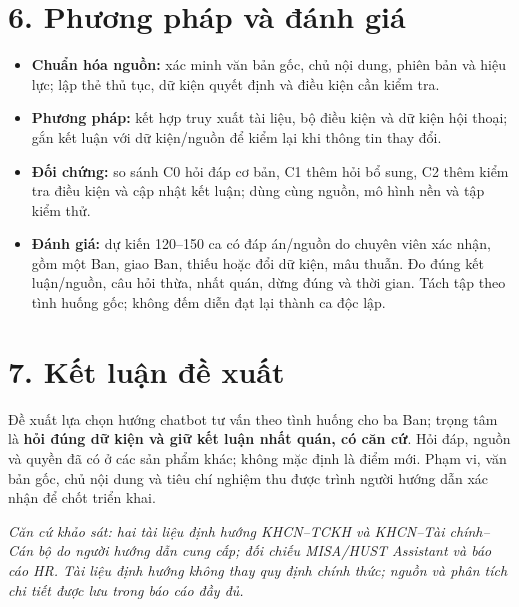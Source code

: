 \documentclass[12pt,a4paper]{article}
\begin{document}
\section*{6. Phương pháp và đánh giá}
\begin{itemize}
\item \textbf{Chuẩn hóa nguồn:} xác minh văn bản gốc, chủ nội dung, phiên bản và hiệu lực; lập thẻ thủ tục, dữ kiện quyết định và điều kiện cần kiểm tra.
\item \textbf{Phương pháp:} kết hợp truy xuất tài liệu, bộ điều kiện và dữ kiện hội thoại; gắn kết luận với dữ kiện/nguồn để kiểm lại khi thông tin thay đổi.
\item \textbf{Đối chứng:} so sánh C0 hỏi đáp cơ bản, C1 thêm hỏi bổ sung, C2 thêm kiểm tra điều kiện và cập nhật kết luận; dùng cùng nguồn, mô hình nền và tập kiểm thử.
\item \textbf{Đánh giá:} dự kiến 120--150 ca có đáp án/nguồn do chuyên viên xác nhận, gồm một Ban, giao Ban, thiếu hoặc đổi dữ kiện, mâu thuẫn. Đo đúng kết luận/nguồn, câu hỏi thừa, nhất quán, dừng đúng và thời gian. Tách tập theo tình huống gốc; không đếm diễn đạt lại thành ca độc lập.
\end{itemize}

\section*{7. Kết luận đề xuất}
Đề xuất lựa chọn hướng chatbot tư vấn theo tình huống cho ba Ban; trọng tâm là \textbf{hỏi đúng dữ kiện và giữ kết luận nhất quán, có căn cứ}. Hỏi đáp, nguồn và quyền đã có ở các sản phẩm khác; không mặc định là điểm mới. Phạm vi, văn bản gốc, chủ nội dung và tiêu chí nghiệm thu được trình người hướng dẫn xác nhận để chốt triển khai.

{\footnotesize\textit{Căn cứ khảo sát: hai tài liệu định hướng KHCN--TCKH và KHCN--Tài chính--Cán bộ do người hướng dẫn cung cấp; đối chiếu MISA/HUST Assistant và báo cáo HR. Tài liệu định hướng không thay quy định chính thức; nguồn và phân tích chi tiết được lưu trong báo cáo đầy đủ.}}
\end{document}

